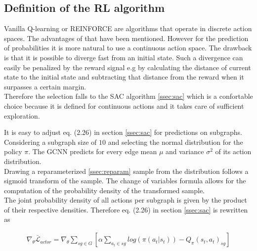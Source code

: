 \subsection{Definition of the RL algorithm}
Vanilla Q-learning or REINFORCE are algorithms that operate in discrete action spaces. The advantages of that have been mentioned. However for the prediction of probabilities it is more natural to use a continuous action space. The drawback is that it is possible to diverge fast from an initial state. Such a divergence can easily be penalized by the reward signal e.g by calculating the distance of current state to the initial state and subtracting that distance from the reward when it surpasses a certain margin. \\
Therefore the selection falls to the SAC algorithm \ref{ssec:sac} which is a confortable choice because it is defined for continuous actions and it takes care of sufficient exploration. 

It is easy to adjust eq. (2.26) in section \ref{ssec:sac} for predictions on subgraphs. Considering a subgraph size of $10$ and selecting the normal distribution for the policy $\pi$. The GCNN predicts for every edge mean $\mu$ and variance $\sigma ^2$ of its action distribution. \\
Drawing a reparameterized \ref{ssec:reparam} sample from the distribution follows a sigmoid transform of the sample. The change of variables formula \cite{papamakarios2019normalizing} allows for the computation of the probability density of the transformed sample. \\
The joint probability density of all actions per subgraph is given by the product of their respective densities. Therefore eq. (2.26) in section \ref{ssec:sac} is rewritten as

\begin{align}
	\nabla_\theta \bar{\mathcal{L}}_{actor} = \nabla_\theta \sum_{sg \in G} \left[ \alpha \sum_{a_t\in sg}log(\pi(a_t|s_t)) - Q_\pi(s_t, a_t)_{sg} \right]
\end{align}

